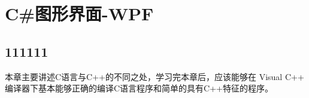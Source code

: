 ﻿%

\chapter{C\#图形界面-WPF}
\section{111111}
本章主要讲述C语言与C++的不同之处，学习完本章后，应该能够在 Visual C++
编译器下基本能够正确的编译C语言程序和简单的具有C++特征的程序。

 
